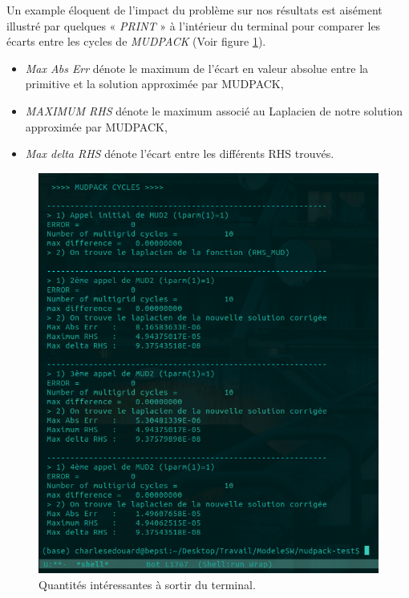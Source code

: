 \documentclass[10pt]{article}
\numberwithin{equation}{section}
\begin{document}
Un example éloquent de l'impact du problème sur nos résultats est aisément illustré par quelques « \emph{PRINT} » à l'intérieur du terminal pour comparer les écarts entre les cycles de \emph{MUDPACK} (Voir figure \ref{fig:org64c38c7}).
\begin{itemize}
\item \emph{Max Abs Err} dénote le maximum de l'écart en valeur absolue entre la primitive et la solution approximée par MUDPACK,
\item \emph{MAXIMUM RHS} dénote le maximum associé au Laplacien de notre solution approximée par MUDPACK,
\item \emph{Max delta RHS} dénote l'écart entre les différents RHS trouvés.
\end{itemize}

\begin{figure}[!htpb]
\centering
\includegraphics[width=\textwidth]{figures/debuggage/2023-08-28_screenshot.png}
\caption{\label{fig:org64c38c7}Quantités intéressantes à sortir du terminal.}
\end{figure}
\end{document}
